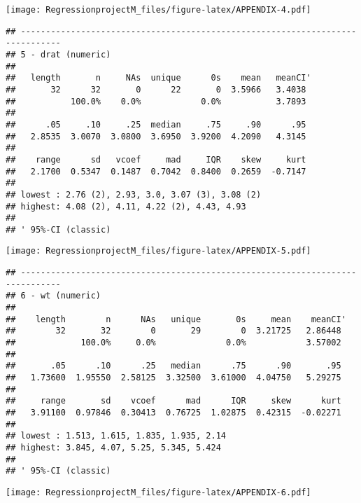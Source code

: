 \documentclass[
]{article}
\begin{document}
\texttt{[image: RegressionprojectM\_files/figure-latex/APPENDIX-4.pdf]}

\begin{verbatim}
## ------------------------------------------------------------------------------ 
## 5 - drat (numeric)
## 
##   length       n     NAs  unique      0s    mean   meanCI'
##       32      32       0      22       0  3.5966   3.4038
##           100.0%    0.0%            0.0%           3.7893
##                                                          
##      .05     .10     .25  median     .75     .90      .95
##   2.8535  3.0070  3.0800  3.6950  3.9200  4.2090   4.3145
##                                                          
##    range      sd   vcoef     mad     IQR    skew     kurt
##   2.1700  0.5347  0.1487  0.7042  0.8400  0.2659  -0.7147
##                                                          
## lowest : 2.76 (2), 2.93, 3.0, 3.07 (3), 3.08 (2)
## highest: 4.08 (2), 4.11, 4.22 (2), 4.43, 4.93
## 
## ' 95%-CI (classic)
\end{verbatim}

\texttt{[image: RegressionprojectM\_files/figure-latex/APPENDIX-5.pdf]}

\begin{verbatim}
## ------------------------------------------------------------------------------ 
## 6 - wt (numeric)
## 
##    length        n      NAs   unique       0s     mean    meanCI'
##        32       32        0       29        0  3.21725   2.86448
##             100.0%     0.0%              0.0%            3.57002
##                                                                 
##       .05      .10      .25   median      .75      .90       .95
##   1.73600  1.95550  2.58125  3.32500  3.61000  4.04750   5.29275
##                                                                 
##     range       sd    vcoef      mad      IQR     skew      kurt
##   3.91100  0.97846  0.30413  0.76725  1.02875  0.42315  -0.02271
##                                                                 
## lowest : 1.513, 1.615, 1.835, 1.935, 2.14
## highest: 3.845, 4.07, 5.25, 5.345, 5.424
## 
## ' 95%-CI (classic)
\end{verbatim}

\texttt{[image: RegressionprojectM\_files/figure-latex/APPENDIX-6.pdf]}
\end{document}
